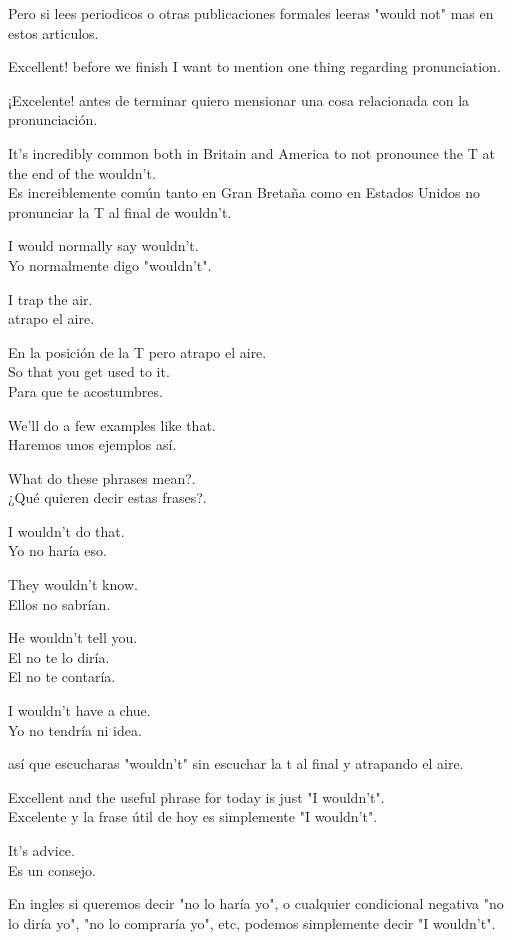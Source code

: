 Pero si lees periodicos o otras publicaciones formales leeras
"would not" mas en estos articulos.

Excellent! before we finish I want to mention one thing regarding
pronunciation.

¡Excelente! antes de terminar quiero mensionar una cosa relacionada
con la pronunciación.

It's incredibly common both in Britain and America to not pronounce the T
at the end of the wouldn't.\\
Es increiblemente común tanto en Gran Bretaña como en Estados Unidos no
pronunciar la T al final de wouldn't.

I would normally say wouldn't.\\
Yo normalmente digo "wouldn't".

I trap the air.\\
atrapo el aire.

En la posición de la T pero atrapo el aire.\\

So that you get used to it.\\
Para que te acostumbres.

We'll do a few examples like that.\\
Haremos unos ejemplos así.

What do these phrases mean?.\\
¿Qué quieren decir estas frases?.

I wouldn't do that.\\
Yo no haría eso.

They wouldn't know.\\
Ellos no sabrían.

He wouldn't tell you.\\
El no te lo diría.\\
El no te contaría.

I wouldn't have a chue.\\
Yo no tendría ni idea.

así que escucharas "wouldn't" sin escuchar la t
al final y atrapando el aire.

Excellent and the useful phrase for today is just "I wouldn't".\\
Excelente y la frase útil de hoy es simplemente "I wouldn't".

It's advice.\\
Es un consejo.

En ingles si queremos decir "no lo haría yo", o cualquier condicional
negativa "no lo diría yo", "no lo compraría yo", etc, podemos simplemente
decir "I wouldn't".

